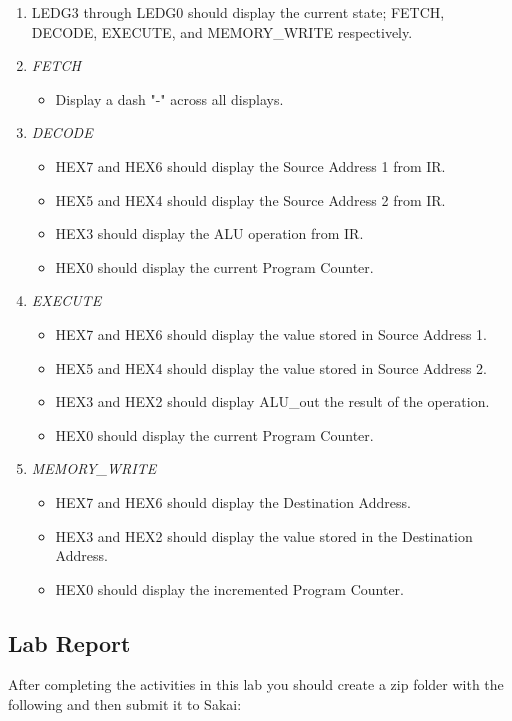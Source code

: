 \begin{enumerate}
	\item LEDG3 through LEDG0 should display the current state; FETCH, DECODE, EXECUTE, and MEMORY\_WRITE respectively. 
	\item \emph{FETCH}
	\begin{itemize}
		 \item Display a dash "-" across all displays.
	\end{itemize}
	\item \emph{DECODE}
	\begin{itemize}
		\item HEX7 and HEX6 should display the Source Address 1 from IR.
		\item HEX5 and HEX4 should display the Source Address 2 from IR.
		\item HEX3 should display the ALU operation from IR.
		\item HEX0 should display the current Program Counter.
	\end{itemize}
	\item \emph{EXECUTE}
	\begin{itemize}
		\item HEX7 and HEX6 should display the value stored in Source Address 1.
		\item HEX5 and HEX4 should display the value stored in Source Address 2.
		\item HEX3 and HEX2 should display ALU\_out the result of the operation.
		\item HEX0 should display the current Program Counter.
	\end{itemize}
	\item \emph{MEMORY\_WRITE}
	\begin{itemize}
		\item HEX7 and HEX6 should display the Destination Address.
		\item HEX3 and HEX2 should display the value stored in the Destination Address.
		\item HEX0 should display the incremented Program Counter.
	\end{itemize}
\end{enumerate}

\subsection{Lab Report}
After completing the activities in this lab you should create a zip folder with the following and then submit it to Sakai:

